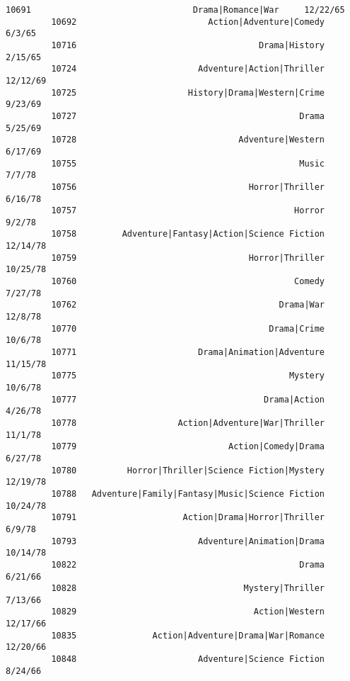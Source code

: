 \documentclass[11pt]{article}
\begin{document}
\begin{Verbatim}[commandchars=\\\{\}]
         10691                                Drama|Romance|War     12/22/65   
         10692                          Action|Adventure|Comedy       6/3/65   
         10716                                    Drama|History      2/15/65   
         10724                        Adventure|Action|Thriller     12/12/69   
         10725                      History|Drama|Western|Crime      9/23/69   
         10727                                            Drama      5/25/69   
         10728                                Adventure|Western      6/17/69   
         10755                                            Music       7/7/78   
         10756                                  Horror|Thriller      6/16/78   
         10757                                           Horror       9/2/78   
         10758         Adventure|Fantasy|Action|Science Fiction     12/14/78   
         10759                                  Horror|Thriller     10/25/78   
         10760                                           Comedy      7/27/78   
         10762                                        Drama|War      12/8/78   
         10770                                      Drama|Crime      10/6/78   
         10771                        Drama|Animation|Adventure     11/15/78   
         10775                                          Mystery      10/6/78   
         10777                                     Drama|Action      4/26/78   
         10778                    Action|Adventure|War|Thriller      11/1/78   
         10779                              Action|Comedy|Drama      6/27/78   
         10780          Horror|Thriller|Science Fiction|Mystery     12/19/78   
         10788   Adventure|Family|Fantasy|Music|Science Fiction     10/24/78   
         10791                     Action|Drama|Horror|Thriller       6/9/78   
         10793                        Adventure|Animation|Drama     10/14/78   
         10822                                            Drama      6/21/66   
         10828                                 Mystery|Thriller      7/13/66   
         10829                                   Action|Western     12/17/66   
         10835               Action|Adventure|Drama|War|Romance     12/20/66   
         10848                        Adventure|Science Fiction      8/24/66   
         

\end{Verbatim}
\end{document}
